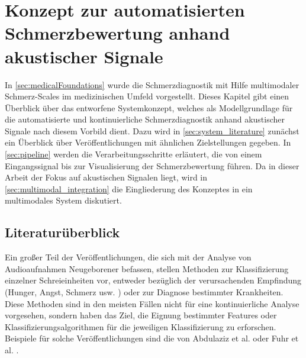 \chapter{Konzept zur automatisierten Schmerzbewertung anhand akustischer Signale}
\label{sec:concept}

In \autoref{sec:medicalFoundations} wurde die Schmerzdiagnostik mit Hilfe multimodaler Schmerz-Scales im medizinischen Umfeld vorgestellt. Dieses Kapitel gibt einen Überblick über das entworfene Systemkonzept, welches als Modellgrundlage für die automatisierte und kontinuierliche Schmerzdiagnostik anhand akustischer Signale nach diesem Vorbild dient. Dazu wird in \autoref{sec:system_literature} zunächst ein Überblick über Veröffentlichungen mit ähnlichen Zielstellungen gegeben. In \autoref{sec:pipeline} werden die Verarbeitungsschritte erläutert, die von einem Eingangssignal bis zur Visualisierung der Schmerzbewertung führen. Da in dieser Arbeit der Fokus auf akustischen Signalen liegt, wird in \autoref{sec:multimodal_integration} die Eingliederung des Konzeptes in ein multimodales System diskutiert.

\section{Literaturüberblick}
\label{sec:system_literature}

Ein großer Teil der Veröffentlichungen, die sich mit der Analyse von Audioaufnahmen Neugeborener befassen, stellen Methoden zur Klassifizierung einzelner Schreieinheiten vor, entweder bezüglich der verursachenden Empfindung (Hunger, Angst, Schmerz usw. ) oder zur Diagnose bestimmter Krankheiten. Diese Methoden sind in den meisten Fällen nicht für eine kontinuierliche Analyse vorgesehen, sondern haben das Ziel, die Eignung bestimmter Features oder Klassifizierungsalgorithmen für die jeweiligen Klassifizierung zu erforschen. Beispiele für solche Veröffentlichungen sind die von Abdulaziz et al. \cite{class_abdulaziz} oder Fuhr et al. \cite{comparisonOfLearning}.

